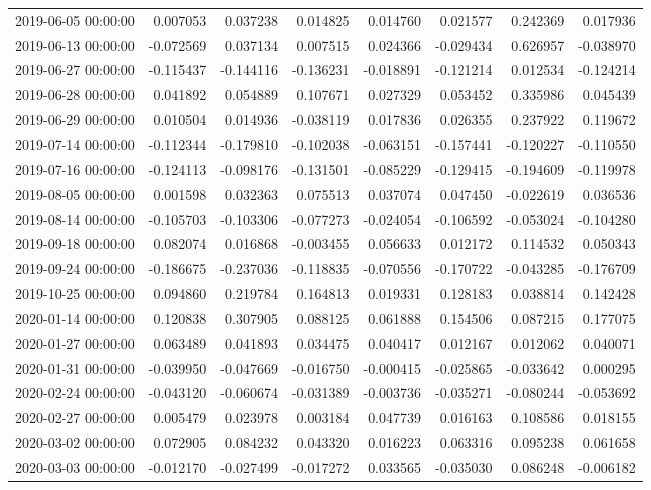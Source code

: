 \begin{tabular}{lrrrrrrr}
2019-06-05 00:00:00 & 0.007053 & 0.037238 & 0.014825 & 0.014760 & 0.021577 & 0.242369 & 0.017936 \\
2019-06-13 00:00:00 & -0.072569 & 0.037134 & 0.007515 & 0.024366 & -0.029434 & 0.626957 & -0.038970 \\
2019-06-27 00:00:00 & -0.115437 & -0.144116 & -0.136231 & -0.018891 & -0.121214 & 0.012534 & -0.124214 \\
2019-06-28 00:00:00 & 0.041892 & 0.054889 & 0.107671 & 0.027329 & 0.053452 & 0.335986 & 0.045439 \\
2019-06-29 00:00:00 & 0.010504 & 0.014936 & -0.038119 & 0.017836 & 0.026355 & 0.237922 & 0.119672 \\
2019-07-14 00:00:00 & -0.112344 & -0.179810 & -0.102038 & -0.063151 & -0.157441 & -0.120227 & -0.110550 \\
2019-07-16 00:00:00 & -0.124113 & -0.098176 & -0.131501 & -0.085229 & -0.129415 & -0.194609 & -0.119978 \\
2019-08-05 00:00:00 & 0.001598 & 0.032363 & 0.075513 & 0.037074 & 0.047450 & -0.022619 & 0.036536 \\
2019-08-14 00:00:00 & -0.105703 & -0.103306 & -0.077273 & -0.024054 & -0.106592 & -0.053024 & -0.104280 \\
2019-09-18 00:00:00 & 0.082074 & 0.016868 & -0.003455 & 0.056633 & 0.012172 & 0.114532 & 0.050343 \\
2019-09-24 00:00:00 & -0.186675 & -0.237036 & -0.118835 & -0.070556 & -0.170722 & -0.043285 & -0.176709 \\
2019-10-25 00:00:00 & 0.094860 & 0.219784 & 0.164813 & 0.019331 & 0.128183 & 0.038814 & 0.142428 \\
2020-01-14 00:00:00 & 0.120838 & 0.307905 & 0.088125 & 0.061888 & 0.154506 & 0.087215 & 0.177075 \\
2020-01-27 00:00:00 & 0.063489 & 0.041893 & 0.034475 & 0.040417 & 0.012167 & 0.012062 & 0.040071 \\
2020-01-31 00:00:00 & -0.039950 & -0.047669 & -0.016750 & -0.000415 & -0.025865 & -0.033642 & 0.000295 \\
2020-02-24 00:00:00 & -0.043120 & -0.060674 & -0.031389 & -0.003736 & -0.035271 & -0.080244 & -0.053692 \\
2020-02-27 00:00:00 & 0.005479 & 0.023978 & 0.003184 & 0.047739 & 0.016163 & 0.108586 & 0.018155 \\
2020-03-02 00:00:00 & 0.072905 & 0.084232 & 0.043320 & 0.016223 & 0.063316 & 0.095238 & 0.061658 \\
2020-03-03 00:00:00 & -0.012170 & -0.027499 & -0.017272 & 0.033565 & -0.035030 & 0.086248 & -0.006182 \\

\end{tabular}
